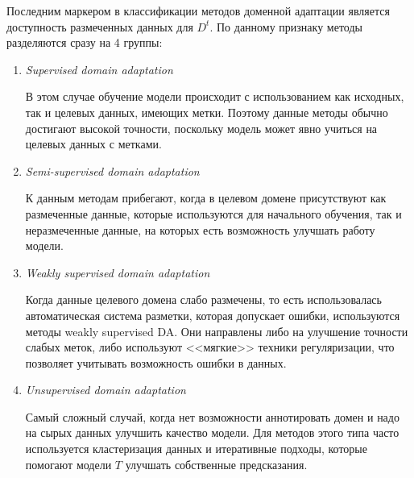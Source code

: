 \hfill \break
Последним маркером в классификации методов доменной адаптации является доступность размеченных данных для $D^t$. По данному признаку методы разделяются сразу на 4 группы:

\begin{enumerate}
\item \textit{Supervised domain adaptation}

В этом случае обучение модели происходит с использованием как исходных, так и целевых данных, имеющих метки. Поэтому данные методы обычно достигают высокой точности, поскольку модель может явно учиться на целевых данных с метками.

\item \textit{Semi-supervised domain adaptation}

К данным методам прибегают, когда в целевом домене присутствуют как размеченные данные, которые используются для начального обучения, так и неразмеченные данные, на которых есть возможность улучшать работу модели. 

\item \textit{Weakly supervised domain adaptation}

Когда данные целевого домена слабо размечены, то есть использовалась автоматическая система разметки, которая допускает ошибки, используются методы weakly supervised DA. Они направлены либо на улучшение точности слабых меток, либо используют <<мягкие>> техники регуляризации, что позволяет учитывать возможность ошибки в данных.


\item \textit{Unsupervised domain adaptation}

Самый сложный случай, когда нет возможности аннотировать домен и надо на сырых данных улучшить качество модели. Для методов этого типа часто используется кластеризация данных и итеративные подходы, которые помогают модели $T$ улучшать собственные предсказания.

\end{enumerate}


\newpage